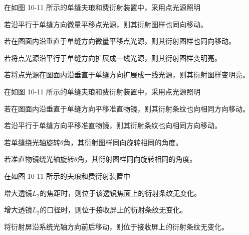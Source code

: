 \documentclass[standard, analysis, notocnum]{ExBook}
\newcommand{\answerarea}[1][8cm]{%
  \par\vspace{2mm}%
  \noindent{\color{themeColor!35}\rule{\linewidth}{0.4pt}}\par
  \noindent\begin{minipage}[t][#1][t]{\linewidth}\vspace{0pt}\end{minipage}\par
  \noindent{\color{themeColor!35}\rule{\linewidth}{0.4pt}}\par
}
\begin{document}
\begin{qitems}
\begin{bbox}
\answerarea[3.5cm]
\end{bbox}
\begin{bbox}
\qitem 在如图 10-11 所示的单缝夫琅和费衍射装置中，采用点光源照明
\par\noindent\hspace{2em}若沿平行于单缝方向微量平移点光源，则其衍射图样也同向移动。
\par\noindent\hspace{2em}若在图面内沿垂直于单缝方向微量平移点光源，则其衍射图样也同向移动。
\par\noindent\hspace{2em}若将点光源沿平行于单缝方向扩展成一线光源，则其衍射图样变明亮。
\par\noindent\hspace{2em}若将点光源在图面内沿垂直于单缝方向扩展成一线光源，则其衍射图样变明亮。
\answerarea[3.5cm]
\end{bbox}
\begin{bbox}
\qitem 在如图 10-11 所示的单缝夫琅和费衍射装置中，采用点光源照明
\par\noindent\hspace{2em}若在图面内沿垂直于单缝方向平移准直物镜，则其衍射条纹也向相同方向移动。
\par\noindent\hspace{2em}若沿平行于单缝方向平移准直物镜，则其衍射条纹也向相同方向移动。
\par\noindent\hspace{2em}若单缝绕光轴旋转$\theta$角，其衍射图样同向旋转相同的角度。
\par\noindent\hspace{2em}若准直物镜绕光轴旋转$\theta$角，其衍射图样同向旋转相同的角度。
\answerarea[3.5cm]
\end{bbox}
\begin{bbox}
\qitem 在如图 10-11 所示的夫琅和费衍射装置中
\par\noindent\hspace{2em}增大透镜$L_{2}$的焦距时，则位于该透镜焦面上的衍射条纹无变化。
\par\noindent\hspace{2em}增大透镜$L_{2}$的口径时，则位于接收屏上的衍射条纹无变化。
\par\noindent\hspace{2em}将衍射屏沿系统光轴方向前后移动，则位于接收屏上的衍射条纹无变化。

\end{bbox}
\end{qitems}
\end{document}
